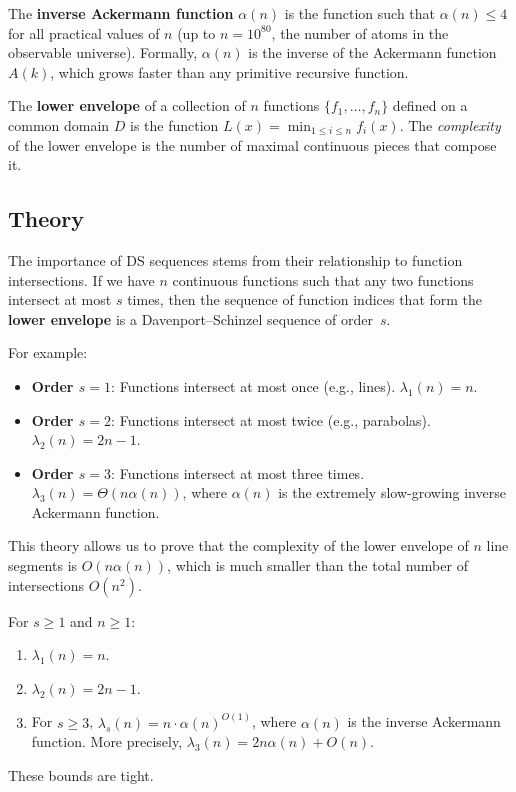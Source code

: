 \begin{definition}\label{def:inverse_ackermann}
The \textbf{inverse Ackermann function} $\alpha(n)$ is the function such that $\alpha(n) \leq 4$ for all practical values of $n$ (up to $n = 10^{80}$, the number of atoms in the observable universe). Formally, $\alpha(n)$ is the inverse of the Ackermann function $A(k)$, which grows faster than any primitive recursive function.
\end{definition}

\begin{definition}\label{def:lower_envelope_ds}
The \textbf{lower envelope} of a collection of $n$ functions $\{f_1, \dots, f_n\}$ defined on a common domain $D$ is the function $L(x) = \min_{1 \leq i \leq n} f_i(x)$. The \emph{complexity} of the lower envelope is the number of maximal continuous pieces that compose it.
\end{definition}

\subsection{Theory}

The importance of DS sequences stems from their relationship to function intersections. If we have $n$ continuous functions such that any two functions intersect at most $s$ times, then the sequence of function indices that form the \textbf{lower envelope} is a Davenport--Schinzel sequence of order~$s$.

For example:
\begin{itemize}
    \item \textbf{Order $s=1$}: Functions intersect at most once (e.g., lines). $\lambda_1(n) = n$.
    \item \textbf{Order $s=2$}: Functions intersect at most twice (e.g., parabolas). $\lambda_2(n) = 2n - 1$.
    \item \textbf{Order $s=3$}: Functions intersect at most three times. $\lambda_3(n) = \Theta(n \alpha(n))$, where $\alpha(n)$ is the extremely slow-growing inverse Ackermann function.
\end{itemize}

This theory allows us to prove that the complexity of the lower envelope of $n$ line segments is $O(n \alpha(n))$, which is much smaller than the total number of intersections $O(n^2)$.

\begin{theorem}\label{thm:ds_bounds}
For $s \geq 1$ and $n \geq 1$:
\begin{enumerate}
    \item $\lambda_1(n) = n$.
    \item $\lambda_2(n) = 2n - 1$.
    \item For $s \geq 3$, $\lambda_s(n) = n \cdot \alpha(n)^{O(1)}$, where $\alpha(n)$ is the inverse Ackermann function. More precisely, $\lambda_3(n) = 2n\alpha(n) + O(n)$.
\end{enumerate}
These bounds are tight.
\end{theorem}

